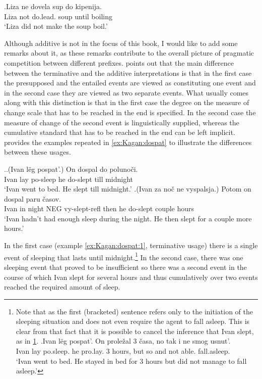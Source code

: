 \exg.\label{ex:do:PP:ne}Liza ne dovela sup do kipenija.\\
Liza not do.lead. soup until boiling\\
\trans `Liza did not make the soup boil.'

Although additive  is not in the focus of this book, I would like to add some remarks about it, as these remarks contribute to the overall picture of pragmatic competition between different prefixes. \citet[79]{Kagan:book} points out that the main difference between the terminative and the additive interpretations is that in the first case the presupposed and the entailed events are viewed as constituting one event and in the second case they are viewed as two separate events. What usually comes along with this distinction is that in the first case the degree on the measure of change scale that has to be reached in the end is specified. In the second case the measure of change of the second event is linguistically supplied, whereas the cumulative standard that has to be reached in the end can be left implicit. \citet[79]{Kagan:book} provides the examples repeated in \ref{ex:Kagan:dospat} to illustrate the differences between these usages.

\ex.\label{ex:Kagan:dospat}\ag.\label{ex:Kagan:dospat:1}(Ivan l\"{e}g pospat'.) On dospal do poluno\v{c}i.\\
Ivan lay po-sleep he do-slept till midnight\\
\trans `Ivan went to bed. He slept till midnight.'
\bg.\label{ex:Kagan:dospat:2}(Ivan za no\v{c} ne vyspalsja.) Potom on dospal paru \v{c}asov.\\
Ivan in night NEG vy-slept-refl then he do-slept couple hours\\
\trans `Ivan hadn't had enough sleep during the night. He then slept for a couple more hours.'

In the first case (example \ref{ex:Kagan:dospat:1}, terminative usage) there is a single event of sleeping that lasts until midnight.\footnote{Note that as the first (bracketed) sentence refers only to the initiation of the sleeping situation and does not even require the agent to fall asleep. This is clear from that fact that it is possible to cancel the inference that Ivan slept, as in \ref{ex:dospat:no}.
\exg.\label{ex:dospat:no}Ivan l\"{e}g pospat'. On prole\v{z}al 3 \v{c}asa, no tak i ne smog usnut'.\\
Ivan lay po.sleep. he pro.lay. 3 hours, but so and not able. fall.asleep.\\
\trans `Ivan went to bed. He stayed in bed for 3 hours but did not manage to fall asleep.'

} In the second case, there was one sleeping event that proved to be insufficient so there was a second event in the course of which Ivan slept for several hours and thus cumulatively over two events reached the required amount of sleep. 

